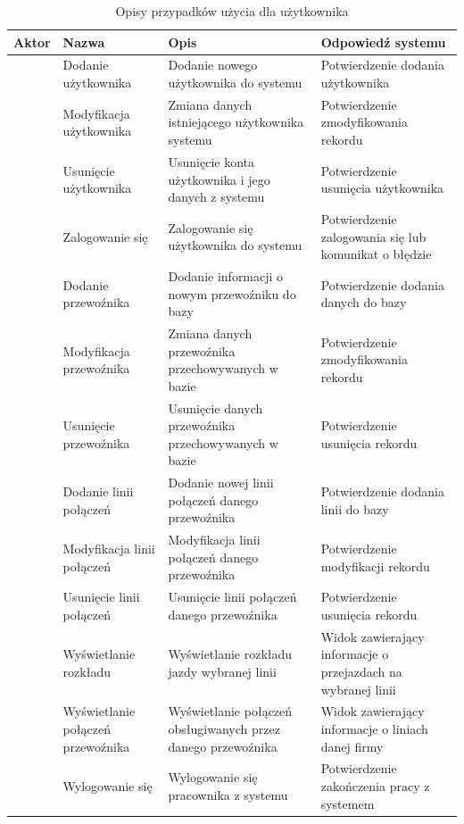\documentclass[10pt,a4paper]{article}
\begin{document}
\begin{table}[H]
	\begin{tabularx}{\textwidth}{|c|X|X|X|}
		\hline
		\textbf{Aktor} & \textbf{Nazwa} & \textbf{Opis} & \textbf{Odpowiedź systemu} \\
		\hline
		\multirow{6}{*}{\rotatebox[origin=c]{90}{Administrator}}
		& Dodanie użytkownika
		& Dodanie nowego użytkownika do systemu
		& Potwierdzenie dodania użytkownika \\
		\cline {2-4}
		& Modyfikacja użytkownika
		& Zmiana danych istniejącego użytkownika systemu
		& Potwierdzenie zmodyfikowania rekordu \\
		\cline{2-4}
		& Usunięcie użytkownika
		& Usunięcie konta użytkownika i jego danych z systemu
		& Potwierdzenie usunięcia użytkownika \\
		\hline
		\multirow{26}{*}{\rotatebox[origin=c]{90}{Pracownik}}
		& Zalogowanie się 
		& Zalogowanie się użytkownika do systemu
		& Potwierdzenie zalogowania się lub komunikat o błędzie \\
		\cline{2-4}
		& Dodanie przewoźnika
		& Dodanie informacji o nowym przewoźniku do bazy
		& Potwierdzenie dodania danych do bazy \\
		\cline{2-4}
		& Modyfikacja przewoźnika
		& Zmiana danych przewoźnika przechowywanych w bazie
		& Potwierdzenie zmodyfikowania rekordu \\
		\cline{2-4}
		& Usunięcie przewoźnika
		& Usunięcie danych przewoźnika przechowywanych w bazie
		& Potwierdzenie usunięcia rekordu \\
		\cline{2-4}
		& Dodanie linii połączeń
		& Dodanie nowej linii połączeń danego przewoźnika
		& Potwierdzenie dodania linii do bazy \\
		\cline{2-4}
		& Modyfikacja linii połączeń
		& Modyfikacja linii połączeń danego przewoźnika
		& Potwierdzenie modyfikacji rekordu \\
		\cline{2-4}
		& Usunięcie linii połączeń
		& Usunięcie linii połączeń danego przewoźnika
		& Potwierdzenie usunięcia rekordu \\
		\cline{2-4}
		& Wyświetlanie rozkładu
		& Wyświetlanie rozkładu jazdy wybranej linii
		& Widok zawierający informacje o przejazdach na wybranej linii \\
		\cline{2-4}
		& Wyświetlanie połączeń przewoźnika
		& Wyświetlanie połączeń obsługiwanych przez danego przewoźnika
		& Widok zawierający informacje o liniach danej firmy \\
		\cline{2-4}
		& Wylogowanie się
		& Wylogowanie się pracownika z systemu
		& Potwierdzenie zakończenia pracy z systemem \\
		\hline
	\end{tabularx}
	\caption{Opisy przypadków użycia dla użytkownika}
\end{table}
\end{document}
